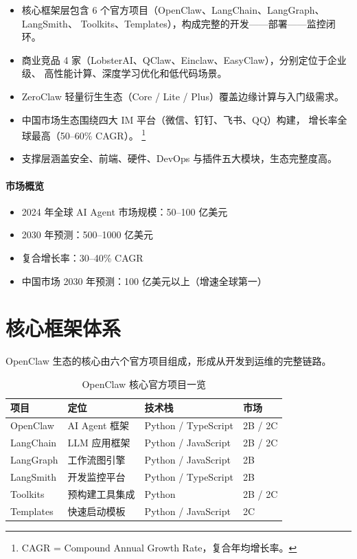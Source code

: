 \documentclass[
  customlatinfont = macos,
]{hkustthesis}
\begin{document}
\begin{itemize}[nosep]
  \item 核心框架层包含 6 个官方项目（OpenClaw、LangChain、LangGraph、LangSmith、
        Toolkits、Templates），构成完整的开发——部署——监控闭环。
  \item 商业竞品 4 家（LobsterAI、QClaw、Einclaw、EasyClaw），分别定位于企业级、
        高性能计算、深度学习优化和低代码场景。
  \item ZeroClaw 轻量衍生生态（Core / Lite / Plus）覆盖边缘计算与入门级需求。
  \item 中国市场生态围绕四大 IM 平台（微信、钉钉、飞书、QQ）构建，
        增长率全球最高（50--60\% CAGR）。%
        \footnote{CAGR = Compound Annual Growth Rate，复合年均增长率。}
  \item 支撑层涵盖安全、前端、硬件、DevOps 与插件五大模块，生态完整度高。
\end{itemize}

\paragraph{市场概览}

\begin{itemize}[nosep]
  \item 2024 年全球 AI Agent 市场规模：50--100 亿美元
  \item 2030 年预测：500--1000 亿美元
  \item 复合增长率：30--40\% CAGR
  \item 中国市场 2030 年预测：100 亿美元以上（增速全球第一）
\end{itemize}


\section{核心框架体系}

OpenClaw 生态的核心由六个官方项目组成，形成从开发到运维的完整链路。

\begin{table}[htbp]
\centering
\caption{OpenClaw 核心官方项目一览}
\label{tab:core-projects}
\begin{tabular}{@{}llll@{}}
\toprule
\textbf{项目} & \textbf{定位} & \textbf{技术栈} & \textbf{市场} \\
\midrule
OpenClaw       & AI Agent 框架           & Python / TypeScript & 2B / 2C \\
LangChain      & LLM 应用框架            & Python / JavaScript & 2B / 2C \\
LangGraph      & 工作流图引擎            & Python / JavaScript & 2B      \\
LangSmith      & 开发监控平台            & Python / TypeScript & 2B      \\
Toolkits       & 预构建工具集成          & Python              & 2B / 2C \\
Templates      & 快速启动模板            & Python / JavaScript & 2C      \\
\bottomrule
\end{tabular}
\end{table}
\end{document}
